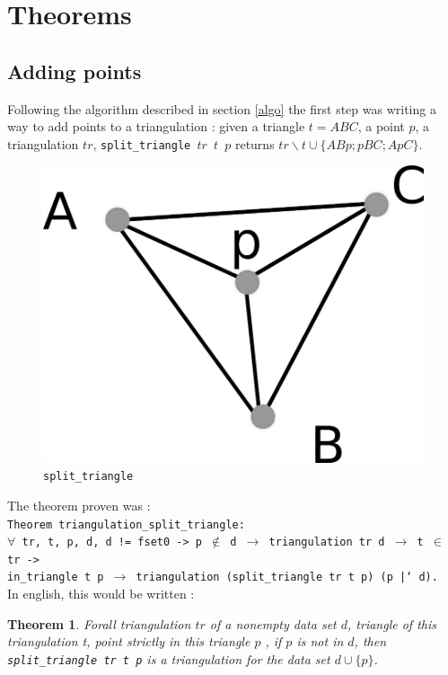 \documentclass[a4paper,10pt]{article}
\newtheorem{theorem}{Theorem}
\begin{document}
\section{Theorems}
\subsection{Adding points}
\label{theorem1}
Following the algorithm described in section \ref{algo} the first step was writing a way to add points to a triangulation : given a triangle $t = ABC$, a point $p$, a triangulation $tr$, {\tt split\_triangle $tr$ $t$ $p$} returns $tr \smallsetminus t \cup \{ABp;pBC;ApC\}$.
\begin{figure}[h]
  \centering
  \caption{\label{split_triangle} {\tt split\_triangle}}
  \includegraphics[scale=2]{split_triangle}
\end{figure}
\newpage
 The theorem proven was :\\
{\tt Theorem triangulation\_split\_triangle:\\
  $\forall$ tr, t, p, d, d != fset0 -> p $\notin$ d $\rightarrow$
                        triangulation tr d $\rightarrow$ t $\in$ tr ->\\
                        in\_triangle t p $\rightarrow$
                        triangulation (split\_triangle tr t p) (p |` d).\\
                       }
In english, this would be written :
\begin{theorem}
  Forall triangulation $tr$ of a nonempty data set $d$,
  triangle of this triangulation t, point strictly in this triangle $p$ ,
  if $p$ is not in $d$, then
  {\tt split\_triangle tr t p} is a triangulation for the data set $d \cup \{p\}$.
\end{theorem}
\end{document}
